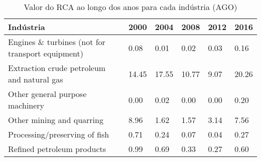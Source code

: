 \begin{table}
\centering
\caption{Valor do RCA ao longo dos anos para cada indústria (AGO)}
\begin{tabular}{p{6cm}p{1.5cm}p{1.5cm}p{1.5cm}p{1.5cm}p{1.5cm}}
\toprule
                                       Indústria &  2000 &  2004 &  2008 & 2012 &  2016 \\
\midrule
Engines \& turbines (not for transport equipment) &  0.08 &  0.01 &  0.02 & 0.03 &  0.16 \\
      Extraction crude petroleum and natural gas & 14.45 & 17.55 & 10.77 & 9.07 & 20.26 \\
                 Other general purpose machinery &  0.00 &  0.02 &  0.00 & 0.00 &  0.20 \\
                       Other mining and quarring &  8.96 &  1.62 &  1.57 & 3.14 &  7.56 \\
                   Processing/preserving of fish &  0.71 &  0.24 &  0.07 & 0.04 &  0.27 \\
                      Refined petroleum products &  0.99 &  0.69 &  0.33 & 0.27 &  0.60 \\
\bottomrule
\end{tabular}
\end{table}
